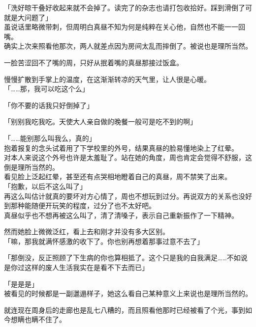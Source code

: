 「洗好晾干叠好收起来就不会掉了。读完了的杂志也请打包收拾好。踩到滑倒了可就是大问题了」\\

虽说话里略微带刺，但周明白真昼不知为何是纯粹在关心他，自然也不能一一回嘴。\\

确实上次来照看他那次，两人就差点因为房间太乱而摔倒了。被说也是理所当然。

一脸苦涩回不了嘴的周，只好从抿着嘴的真昼那接过饭盒。

慢慢扩散到手掌上的温度，在这渐渐转凉的天气里，让人很是心暖。\\

「……那，我可以吃这个么」

「你不要的话我只好倒掉了」

「别别我吃我吃。天使大人亲自做的晚餐一般可是吃不到的啊」

「……能别那么叫我么，真的」\\

抱着报复的念头试着用了下学校里的外号，结果真昼的脸易懂地染上了红晕。\\

对本人来说这个外号也许是太羞耻了。站在她的角度，周也肯定会觉得不舒服，这倒是理所当然的。\\

看见脸上泛起红晕，甚至还有点哭相地瞪着自己的真昼，周不禁笑了出来。\\

「抱歉，以后不这么叫了」\\

再这么叫估计就真的要坏对方心情了，周也不想玩到过分。再说双方的关系也没好到那种能随便开玩笑的程度，过分了也不太好吧。\\

真昼似乎也不想再被这么叫了，清了清嗓子，表示自己重新振作了一下精神。

然而她脸上微微泛红，看上去和刚才并没有多大区别。\\

「嘛，那我就满怀感激的收下了。你也别再想着那事过意不去了」

「那倒没，反正照顾了下生病的你也算相抵了。这个只是我的自我满足……不如说是你过这样的废人生活我实在是看不下去而已」

「是是是」\\

被看见的时候都是一副邋遢样子，她这么看自己某种意义上来说也是理所当然的。

就连现在周身后的走廊也是乱七八糟的，而且照看他那时已经被看了个光，事到如今想瞒也瞒不住了。\\

